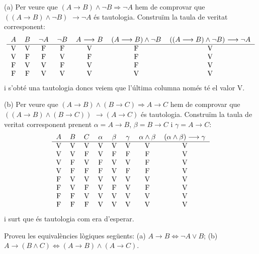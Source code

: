 \begin{solucio}
(a) Per veure que $(A\longrightarrow B)\wedge\lnot B\Longrightarrow\lnot A$
hem de comprovar que $\left(  (A\longrightarrow B)\wedge\lnot B\right)  $
$\longrightarrow\lnot A$ és tautologia. Construïm la taula de veritat
corresponent:%
\[%
\begin{tabular}
[c]{ccccccc}%
$A$ & $B$ & $\lnot A$ & $\lnot B$ & $A$ $\longrightarrow$ $B$ &
$(A\longrightarrow B)\wedge\lnot B$ & $\left(  (A\longrightarrow B)\wedge\lnot
B\right)  $ $\longrightarrow\lnot A$\\\hline
V & V & F & F & V & F & V\\
V & F & F & V & F & F & V\\
F & V & V & F & V & F & V\\
F & F & V & V & V & V & V
\end{tabular}
\]
i s'obté una tautologia doncs veiem que l'última columna només
té el valor V.

(b) Per veure que $\left(  A\longrightarrow B\right)  \wedge\left(
B\longrightarrow C\right)  \Longrightarrow A\longrightarrow C$ hem de
comprovar que $\left(  \left(  A\longrightarrow B\right)  \wedge\left(
B\longrightarrow C\right)  \right)  $ $\longrightarrow\left(  A\longrightarrow
C\right)  $ és tautologia. Construïm la taula de veritat corresponent
prenent $\alpha=A\longrightarrow B$, $\beta=B\longrightarrow C $ i
$\gamma=A\longrightarrow C$:%
\[%
\begin{tabular}
[c]{cccccccc}%
$A$ & $B$ & $C$ & $\alpha$ & $\beta$ & $\gamma$ & $\alpha\wedge\beta$ &
$\left(  \alpha\wedge\beta\right)  \longrightarrow\gamma$\\\hline
V & V & V & V & V & V & V & V\\
V & V & F & V & F & F & F & V\\
V & F & V & F & V & V & F & V\\
V & F & F & F & V & F & F & V\\
F & V & V & V & V & V & V & V\\
F & V & F & V & F & V & F & V\\
F & F & V & V & V & V & V & V\\
F & F & F & V & V & V & V & V
\end{tabular}
\]
i surt que és tautologia com era d'esperar.
\end{solucio}

\begin{exercici}
Proveu les equivalències lògiques següents: (a) $A\longrightarrow
B\Longleftrightarrow\lnot A\vee B$; (b) $A\longrightarrow\left(  B\wedge
C\right)  \Longleftrightarrow\left(  A\longrightarrow B\right)  \wedge\left(
A\longrightarrow C\right)  $.
\end{exercici}

